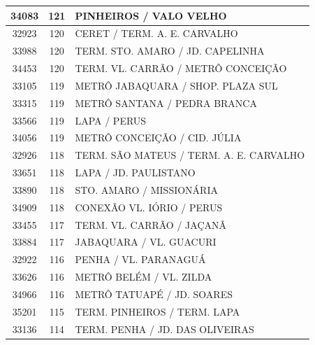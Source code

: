 \documentclass[
	12pt,				%
	oneside,			%
	a4paper,			%
	english,			%
	brazil				%
	]{abntex2ppgsi}
\begin{document}
{{\begin{apendicesenv}
\begin{longtable}{c|c|p{7cm}}
    34083 & 121   & PINHEIROS / VALO VELHO \\
\hline

    32923 & 120   & CERET / TERM. A. E. CARVALHO \\
\hline

    33988 & 120   & TERM. STO. AMARO / JD. CAPELINHA \\
\hline

    34453 & 120   & TERM. VL. CARRÃO / METRÔ CONCEIÇÃO \\
\hline

    33105 & 119   & METRÔ JABAQUARA / SHOP. PLAZA SUL \\
\hline

    33315 & 119   & METRÔ SANTANA / PEDRA BRANCA \\
\hline

    33566 & 119   & LAPA / PERUS \\
\hline

    34056 & 119   & METRÔ CONCEIÇÃO / CID. JÚLIA \\
\hline

    32926 & 118   & TERM. SÃO MATEUS / TERM. A. E. CARVALHO \\
\hline

    33651 & 118   & LAPA / JD. PAULISTANO \\
\hline

    33890 & 118   & STO. AMARO / MISSIONÁRIA \\
\hline

    34909 & 118   & CONEXÃO VL. IÓRIO / PERUS \\
\hline

    33455 & 117   & TERM. VL. CARRÃO / JAÇANÃ \\
\hline

    33884 & 117   & JABAQUARA / VL. GUACURI \\
\hline

    32922 & 116   & PENHA / VL. PARANAGUÁ \\
\hline

    33626 & 116   & METRÔ BELÉM / VL. ZILDA \\
\hline

    34966 & 116   & METRÔ TATUAPÉ / JD. SOARES \\
\hline

    35201 & 115   & TERM. PINHEIROS / TERM. LAPA \\
\hline

    33136 & 114   & TERM. PENHA / JD. DAS OLIVEIRAS \\
\hline


\end{longtable}
\end{apendicesenv}}}
\end{document}
